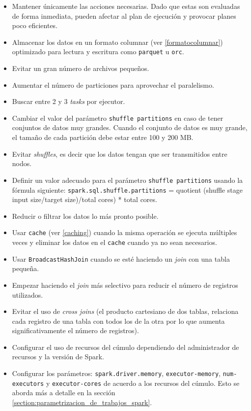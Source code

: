 \begin{itemize}
	\item Mantener únicamente las acciones necesarias. Dado que estas son evaluadas de forma inmediata, pueden afectar al plan de ejecución y provocar planes poco eficientes.
	\item Almacenar los datos en un formato columnar (ver \ref{formatocolumnar}) optimizado para lectura y escritura como \texttt{parquet} u \texttt{orc}.
	\item Evitar un gran número de archivos pequeños.
	\item Aumentar el número de particiones para aprovechar el paralelismo.
	\item Buscar entre 2 y 3 \textit{tasks} por ejecutor.
	\item Cambiar el valor del parámetro \texttt{shuffle partitions} en caso de tener conjuntos de datos muy grandes. Cuando el conjunto de datos es muy grande, el tamaño de cada partición debe estar entre 100 y 200 MB. 
	\item Evitar \textit{shuffles}, es decir que los datos tengan que ser transmitidos entre nodos.
	\item Definir un valor adecuado para el parámetro \texttt{shuffle partitions} usando la fórmula siguiente: \texttt{spark.sql.shuffle.partitions} = quotient (shuffle stage input size/target size)/total cores) * total cores.
	\item Reducir o filtrar los datos lo más pronto posible.
	\item Usar \texttt{cache} (ver \ref{caching}) cuando la misma operación se ejecuta múltiples veces y eliminar los datos en el \texttt{cache} cuando ya no sean necesarios.
	\item Usar \texttt{BroadcastHashJoin} cuando se esté haciendo un \textit{join} con una tabla pequeña.
	\item Empezar haciendo el \textit{join} más selectivo para reducir el número de registros utilizados.
	\item Evitar el uso de \textit{cross joins} (el producto cartesiano de dos tablas, relaciona cada registro de una tabla con todos los de la otra por lo que aumenta significativamente el número de registros).
	\item Configurar el uso de recursos del cúmulo dependiendo del administrador de recursos y la versión de Spark.
	\item Configurar los parámetros: \texttt{spark.driver.memory}, \texttt{executor-memory}, \texttt{num-executors} y \texttt{executor-cores} de acuerdo a los recursos del cúmulo. Esto se aborda más a detalle en la sección \ref{section:parametrizacion_de_trabajos_spark}.

\end{itemize}
